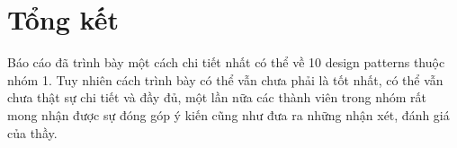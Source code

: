 \documentclass[12pt]{extreport}
\begin{document}



\newpage





















\chapter*{Tổng kết}
Báo cáo đã trình bày một cách chi tiết nhất có thể về 10 design patterns thuộc nhóm 1. Tuy nhiên cách trình bày có thể vẫn chưa phải là tốt nhất, có thể vẫn chưa thật sự chi tiết và đầy đủ, một lần nữa các thành viên trong nhóm rất mong nhận được sự đóng góp ý kiến cũng như đưa ra những nhận xét, đánh giá của thầy.
\end{document}
